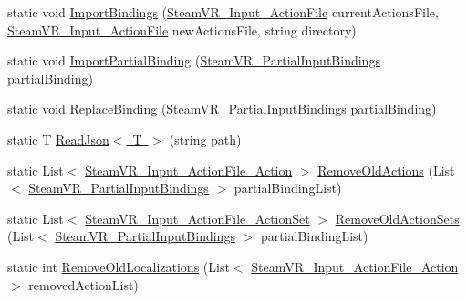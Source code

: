 \begin{DoxyCompactItemize}
\item 
static void \mbox{\hyperlink{class_valve_1_1_v_r_1_1_steam_v_r___input___action_manifest___manager_a8391a5a51019c10a04745119ae1e16d5}{Import\+Bindings}} (\mbox{\hyperlink{class_valve_1_1_v_r_1_1_steam_v_r___input___action_file}{Steam\+V\+R\+\_\+\+Input\+\_\+\+Action\+File}} current\+Actions\+File, \mbox{\hyperlink{class_valve_1_1_v_r_1_1_steam_v_r___input___action_file}{Steam\+V\+R\+\_\+\+Input\+\_\+\+Action\+File}} new\+Actions\+File, string directory)
\item 
static void \mbox{\hyperlink{class_valve_1_1_v_r_1_1_steam_v_r___input___action_manifest___manager_aab7a1f939743acbe656ba6da9c7d029e}{Import\+Partial\+Binding}} (\mbox{\hyperlink{class_valve_1_1_v_r_1_1_steam_v_r___partial_input_bindings}{Steam\+V\+R\+\_\+\+Partial\+Input\+Bindings}} partial\+Binding)
\item 
static void \mbox{\hyperlink{class_valve_1_1_v_r_1_1_steam_v_r___input___action_manifest___manager_a5f6546aff673b524166ecf396e62a696}{Replace\+Binding}} (\mbox{\hyperlink{class_valve_1_1_v_r_1_1_steam_v_r___partial_input_bindings}{Steam\+V\+R\+\_\+\+Partial\+Input\+Bindings}} partial\+Binding)
\item 
static T \mbox{\hyperlink{class_valve_1_1_v_r_1_1_steam_v_r___input___action_manifest___manager_a81b3856a73452d237088335d364adb99}{Read\+Json$<$ T $>$}} (string path)
\item 
static List$<$ \mbox{\hyperlink{class_valve_1_1_v_r_1_1_steam_v_r___input___action_file___action}{Steam\+V\+R\+\_\+\+Input\+\_\+\+Action\+File\+\_\+\+Action}} $>$ \mbox{\hyperlink{class_valve_1_1_v_r_1_1_steam_v_r___input___action_manifest___manager_a5aed0c7718fbf1b0f94e60bad129f3a5}{Remove\+Old\+Actions}} (List$<$ \mbox{\hyperlink{class_valve_1_1_v_r_1_1_steam_v_r___partial_input_bindings}{Steam\+V\+R\+\_\+\+Partial\+Input\+Bindings}} $>$ partial\+Binding\+List)
\item 
static List$<$ \mbox{\hyperlink{class_valve_1_1_v_r_1_1_steam_v_r___input___action_file___action_set}{Steam\+V\+R\+\_\+\+Input\+\_\+\+Action\+File\+\_\+\+Action\+Set}} $>$ \mbox{\hyperlink{class_valve_1_1_v_r_1_1_steam_v_r___input___action_manifest___manager_ae88b3db8a5905d69acc87f259565e5ef}{Remove\+Old\+Action\+Sets}} (List$<$ \mbox{\hyperlink{class_valve_1_1_v_r_1_1_steam_v_r___partial_input_bindings}{Steam\+V\+R\+\_\+\+Partial\+Input\+Bindings}} $>$ partial\+Binding\+List)
\item 
static int \mbox{\hyperlink{class_valve_1_1_v_r_1_1_steam_v_r___input___action_manifest___manager_a7cf57180bbaf2b60179d87c2d0bc8dfb}{Remove\+Old\+Localizations}} (List$<$ \mbox{\hyperlink{class_valve_1_1_v_r_1_1_steam_v_r___input___action_file___action}{Steam\+V\+R\+\_\+\+Input\+\_\+\+Action\+File\+\_\+\+Action}} $>$ removed\+Action\+List)

\end{DoxyCompactItemize}

